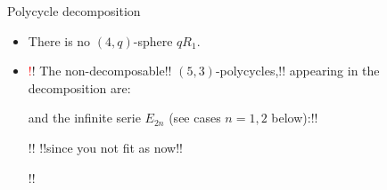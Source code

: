 \documentclass[%
pdf,
colorBG,
slideColor,
]{prosper}
\begin{document}
\begin{slide}{Polycycle decomposition}
\vspace{-3mm}
\begin{itemize}
\item There is no $(4,q)$-sphere $qR_1$.
\item \textcolor{red}
!!%
The non-decomposable!! $(5,3)$-polycycles,!! appearing in the 
decomposition are:
\begin{center}
\begin{minipage}{3.4cm}
\centering
{}\par
\end{minipage}
\begin{minipage}{3.4cm}
\centering
{}\par
\end{minipage}
\begin{minipage}{3.4cm}
\centering
{}\par
\end{minipage}
\begin{minipage}{3.4cm}
\centering
{}\par
\end{minipage}
\begin{minipage}{3.4cm}
\centering
{}\par
\end{minipage}
\end{center}
and the infinite serie $E_{2n}$ (see cases $n=1,2$ below):!!
\begin{center}
\begin{minipage}{4.7cm}
\centering
{}\par
!!%
!!since you not fit as now!!
\end{minipage}
\begin{minipage}{4.7cm}
\centering
{}\par
!!%
\end{minipage}
\end{center}

\end{itemize}
\end{slide}
\end{document}
